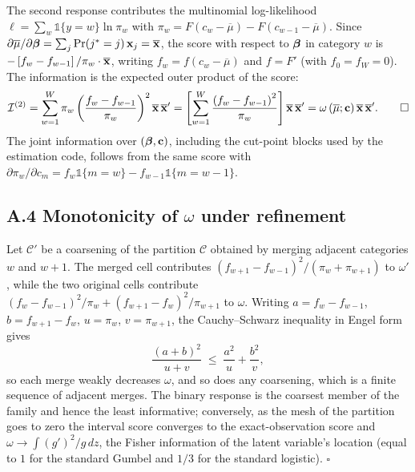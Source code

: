 \documentclass[
  letterpaper,
  DIV=11,
  numbers=noendperiod]{scrartcl}
\theoremstyle{plain}
\theoremstyle{plain}
\theoremstyle{plain}
\theoremstyle{remark}
\begin{document}
The second response contributes the multinomial log-likelihood
\(\ell = \sum_w \mathbb{1}\lbrace y = w \rbrace \ln \pi_w\) with
\(\pi_w = F(c_w - \overline{\mu}) - F(c_{w-1} - \overline{\mu})\). Since
\(\partial \overline{\mu} / \partial \boldsymbol{\beta} = \sum_j \Pr(j^* = j) \, \mathbf{x}_j = \overline{\mathbf{x}}\),
the score with respect to \(\boldsymbol{\beta}\) in category \(w\) is
\(- \left[ f_w - f_{w-1} \right] / \pi_w \cdot \overline{\mathbf{x}}\), writing
\(f_w = f \left( c_w - \overline{\mu} \right)\) and \(f = F'\) (with
\(f_0 = f_W = 0\)). The information is the expected outer product of the
score: \[
\mathcal{I}^{(2)} = \sum_{w=1}^{W} \pi_w \left( \frac{f_w - f_{w-1}}{\pi_w} \right)^2 \overline{\mathbf{x}} \, \overline{\mathbf{x}}'
= \left[ \sum_{w=1}^{W} \frac{ \left( f_w - f_{w-1} \right)^2 }{ \pi_w } \right] \overline{\mathbf{x}} \, \overline{\mathbf{x}}'
= \omega \left( \overline{\mu}; \mathbf{c} \right) \overline{\mathbf{x}} \, \overline{\mathbf{x}}'. \qquad \square
\] The joint information over \(\left( \boldsymbol{\beta}, \mathbf{c} \right)\),
including the cut-point blocks used by the estimation code, follows from
the same score with
\(\partial \pi_w / \partial c_m = f_w \mathbb{1}\lbrace m = w \rbrace - f_{w-1} \mathbb{1}\lbrace m = w-1 \rbrace\).

\subsection*{\texorpdfstring{A.4 Monotonicity of \(\omega\) under
refinement}{A.4 Monotonicity of \textbackslash omega under refinement}}\label{a.4-monotonicity-of-omega-under-refinement}

Let \(\mathcal{C}'\) be a coarsening of the partition \(\mathcal{C}\)
obtained by merging adjacent categories \(w\) and \(w+1\). The merged
cell contributes
\(\left( f_{w+1} - f_{w-1} \right)^2 / \left( \pi_w + \pi_{w+1} \right)\)
to \(\omega'\), while the two original cells contribute
\(\left( f_w - f_{w-1} \right)^2 / \pi_w + \left( f_{w+1} - f_w \right)^2 / \pi_{w+1}\)
to \(\omega\). Writing \(a = f_w - f_{w-1}\), \(b = f_{w+1} - f_w\),
\(u = \pi_w\), \(v = \pi_{w+1}\), the Cauchy--Schwarz inequality in
Engel form gives \[
\frac{(a + b)^2}{u + v} \;\le\; \frac{a^2}{u} + \frac{b^2}{v},
\] so each merge weakly decreases \(\omega\), and so does any
coarsening, which is a finite sequence of adjacent merges. The binary
response is the coarsest member of the family and hence the least
informative; conversely, as the mesh of the partition goes to zero the
interval score converges to the exact-observation score and
\(\omega \to \int \left( g' \right)^2 / g \, dz\), the Fisher
information of the latent variable's location (equal to \(1\) for the
standard Gumbel and \(1/3\) for the standard logistic). \(\square\)
\end{document}
